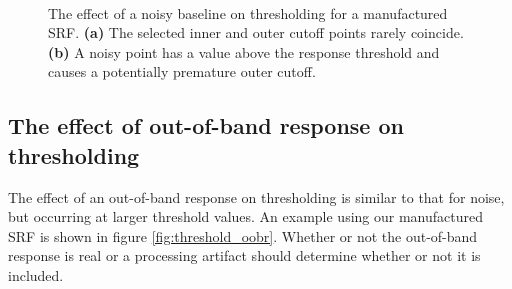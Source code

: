 \begin{figure}[H]
\begin{tabular}{c c}
  \end{tabular} \\
  \caption{The effect of a noisy baseline on thresholding for a manufactured SRF. \textbf{(a)} The selected inner and outer cutoff points rarely coincide. \textbf{(b)} A noisy point has a value above the response threshold and causes a potentially premature outer cutoff.}
  \label{fig:threshold_noise}
\end{figure}


\subsection{The effect of out-of-band response on thresholding}
The effect of an out-of-band response on thresholding is similar to that for noise, but occurring at larger threshold values. An example using our manufactured SRF is shown in figure \ref{fig:threshold_oobr}. Whether or not the out-of-band response is real or a processing artifact should determine whether or not it is included.
